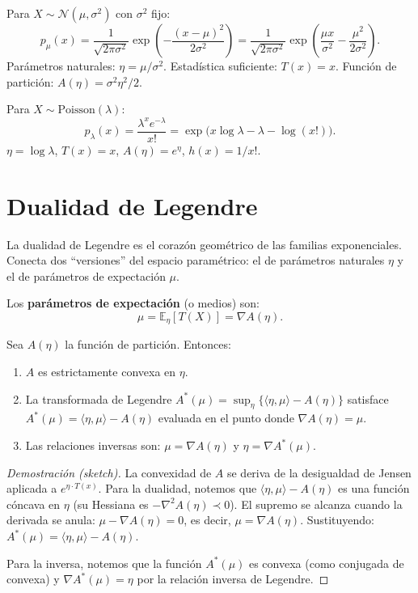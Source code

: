 \begin{example}
	Para $X \sim \mathcal{N}(\mu, \sigma^2)$ con $\sigma^2$ fijo:
	\[
	p_\mu(x) = \frac{1}{\sqrt{2\pi\sigma^2}} \exp\!\left(-\frac{(x-\mu)^2}{2\sigma^2}\right)
	= \frac{1}{\sqrt{2\pi\sigma^2}} \exp\!\left(\frac{\mu x}{\sigma^2} - \frac{\mu^2}{2\sigma^2}\right).
	\]
	Parámetros naturales: $\eta = \mu/\sigma^2$.  Estadística suficiente: $T(x) = x$.  Función de partición: $A(\eta) = \sigma^2 \eta^2/2$.
\end{example}

\begin{example}[Poisson]
	Para $X \sim \mathrm{Poisson}(\lambda)$:
	\[
	p_\lambda(x) = \frac{\lambda^x e^{-\lambda}}{x!} = \exp\!\Big(x \log\lambda - \lambda - \log(x!)\Big).
	\]
	$\eta = \log\lambda$, $T(x) = x$, $A(\eta) = e^\eta$, $h(x) = 1/x!$.
\end{example}

\section{Dualidad de Legendre}

La dualidad de Legendre es el corazón geométrico de las familias exponenciales.  Conecta dos ``versiones'' del espacio paramétrico: el de parámetros naturales $\eta$ y el de parámetros de expectación $\mu$.

\begin{definition}
	Los \textbf{parámetros de expectación} (o medios) son:
	\[
	\mu = \mathbb{E}_\eta[T(X)] = \nabla A(\eta).
	\]
\end{definition}

\begin{theorem}
	Sea $A(\eta)$ la función de partición.  Entonces:
	\begin{enumerate}
		\item $A$ es estrictamente convexa en $\eta$.
		\item La transformada de Legendre $A^*(\mu) = \sup_\eta\{\langle \eta, \mu \rangle - A(\eta)\}$ satisface $A^*(\mu) = \langle \eta, \mu \rangle - A(\eta)$ evaluada en el punto donde $\nabla A(\eta) = \mu$.
		\item Las relaciones inversas son: $\mu = \nabla A(\eta)$ y $\eta = \nabla A^*(\mu)$.
	\end{enumerate}
\end{theorem}

\begin{proof}[Demostración (sketch)]
	La convexidad de $A$ se deriva de la desigualdad de Jensen aplicada a $e^{\eta \cdot T(x)}$.  Para la dualidad, notemos que $\langle \eta, \mu \rangle - A(\eta)$ es una función cóncava en $\eta$ (su Hessiana es $-\nabla^2 A(\eta) \prec 0$).  El supremo se alcanza cuando la derivada se anula: $\mu - \nabla A(\eta) = 0$, es decir, $\mu = \nabla A(\eta)$.  Sustituyendo: $A^*(\mu) = \langle \eta, \mu \rangle - A(\eta)$.

	Para la inversa, notemos que la función $A^*(\mu)$ es convexa (como conjugada de convexa) y $\nabla A^*(\mu) = \eta$ por la relación inversa de Legendre.
\end{proof}

